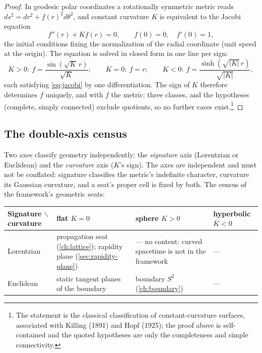 \documentclass[11pt]{amsbook}
\theoremstyle{plain}
\theoremstyle{definition}
\theoremstyle{remark}
\begin{document}
\begin{proof}
In geodesic polar coordinates a rotationally symmetric metric reads $ds^{2} = dr^{2} + f(r)^{2}d\theta^{2}$, and constant curvature $K$ is equivalent to the Jacobi equation
\begin{equation}\label{eq:jacobi}
f''(r) + K f(r) = 0, \qquad f(0) = 0,\quad f'(0) = 1,
\end{equation}
the initial conditions fixing the normalization of the radial coordinate (unit speed at the origin). The equation is solved in closed form in one line per sign:
\begin{equation}\label{eq:jacobi-sol}
K > 0:\ f = \frac{\sin(\sqrt{K}\,r)}{\sqrt{K}};\qquad
K = 0:\ f = r;\qquad
K < 0:\ f = \frac{\sinh(\sqrt{|K|}\,r)}{\sqrt{|K|}},
\end{equation}
each satisfying \cref{eq:jacobi} by one differentiation. The sign of $K$ therefore determines $f$ uniquely, and with $f$ the metric: three classes, and the hypotheses (complete, simply connected) exclude quotients, so no further cases exist.\footnote{The statement is the classical classification of constant-curvature surfaces, associated with Killing (1891) and Hopf (1925); the proof above is self-contained and the quoted hypotheses are only the completeness and simple connectivity.}
\end{proof}

\subsection{The double-axis census}\label{sec:double-axis}

Two axes classify geometry independently: the \emph{signature} axis (Lorentzian or Euclidean) and the \emph{curvature} axis ($K$'s sign). The axes are independent and must not be conflated: signature classifies the metric's indefinite character, curvature its Gaussian curvature, and a seat's proper cell is fixed by both. The census of the framework's geometric seats:
\begin{center}
\begin{tabular}{@{}p{1.8cm}|p{3.8cm}p{3.5cm}p{1.8cm}@{}}
\toprule
Signature $\backslash$ curvature & flat $K=0$ & sphere $K>0$ & hyperbolic $K<0$ \\
\midrule
Lorentzian & propagation seat (\cref{ch:lattice}); rapidity plane (\cref{sec:rapidity-plane}) & --- no content: curved spacetime is not in the framework & --- \\
Euclidean & static tangent planes of the boundary & boundary $S^{2}$ (\cref{ch:boundary}) & --- \\
\bottomrule
\end{tabular}
\end{center}
\end{document}
